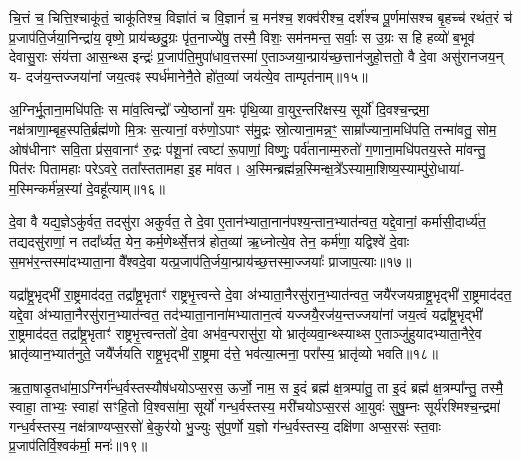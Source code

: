 चि॒त्तं च॒ चित्ति॒श्चाकू॑तं॒ चाकू॑तिश्च॒ विज्ञा॑तं च वि॒ज्ञानं॑ च॒ मन॑श्च॒ शक्व॑रीश्च॒ दर्\mbox{}श॑श्च पू॒र्णमा॑सश्च बृ॒हच्च॑ रथंत॒रं च॑ प्र॒जाप॑ति॒र्जया॒निन्द्रा॑य॒ वृष्णे॒ प्राय॑च्छदु॒ग्रः पृ॑त॒नाज्ये॑षु॒ तस्मै॒ विशः॒ सम॑नमन्त॒ सर्वाः॒ स उ॒ग्रः स हि हव्यो॑ ब॒भूव॑ देवासु॒राः संय॑त्ता आस॒न्थ्स इन्द्रः॑ प्र॒जाप॑ति॒मुपा॑धाव॒त्तस्मा॑ ए॒ताञ्जया॒न्प्राय॑च्छ॒त्तान॑जुहो॒त्ततो॒ वै दे॒वा असु॑रानजय॒न् य- दज॑य॒न्तज्जया॑नां जय॒त्वꣴ स्पर्ध॑मानेनै॒ते हो॑त॒व्या॑ जय॑त्ये॒व ताम्पृत॑नाम्॥१५॥

{\anuvakamend[{उप॒ पञ्च॑विꣳशतिश्च॥४॥}]}

अ॒ग्निर्भू॒ताना॒मधि॑पतिः॒ स मा॑व॒त्विन्द्रो᳚ ज्ये॒ष्ठानां᳚ य॒मः पृ॑थि॒व्या वा॒युर॒न्तरि॑क्षस्य॒ सूर्यो॑ दि॒वश्च॒न्द्रमा॒ नक्ष॑त्राणा॒म्बृह॒स्पति॒र्ब्रह्म॑णो मि॒त्रः स॒त्यानां॒ वरु॑णो॒\-ऽपाꣳ स॑मु॒द्रः स्रो॒त्याना॒मन्न॒ꣳ॒ साम्रा᳚ज्याना॒मधि॑पति॒ तन्मा॑वतु॒ सोम॒ ओष॑धीनाꣳ सवि॒ता प्र॑स॒वानाꣳ॑ रु॒द्रः प॑शू॒नां त्वष्टा॑ रू॒पाणां॒ विष्णुः॒ पर्व॑तानाम्म॒रुतो॑ ग॒णाना॒मधि॑पतय॒स्ते मा॑वन्तु॒ पित॑रः पितामहाः परे\-ऽवरे॒ तता᳚स्ततामहा इ॒ह मा॑वत। अ॒स्मिन्ब्रह्म॑न्न॒स्मिन्क्ष॒त्रे᳚\-ऽस्यामा॒शिष्य॒स्याम्पु॑रो॒धाया॑- म॒स्मिन्कर्म॑न्न॒स्यां दे॒वहू᳚त्याम्॥१६॥

{\anuvakamend[{अ॒व॒रे॒ स॒प्तद॑श च॥५॥}]}

दे॒वा वै यद्य॒ज्ञे\-ऽकु॑र्वत॒ तदसु॑रा अकुर्वत॒ ते दे॒वा ए॒तान॑भ्याता॒नान॑पश्य॒न्तान॒भ्यात॑न्वत॒ यद्दे॒वानां॒ कर्मासी॒दार्ध्य॑त॒ तद्यदसु॑राणां॒ न तदा᳚र्ध्यत॒ येन॒ कर्म॒णेर्थ्से॒त्तत्र॑ होत॒व्या॑ ऋ॒ध्नोत्ये॒व तेन॒ कर्म॑णा॒ यद्विश्वे॑ दे॒वाः स॒मभ॑र॒न्तस्मा॑दभ्याता॒ना वै᳚श्वदे॒वा यत्प्र॒जाप॑ति॒र्जया॒न्प्राय॑च्छ॒त्तस्मा॒ज्जयाः᳚ प्राजाप॒त्याः॥१७॥

यद्रा᳚ष्ट्र॒भृद्भी॑ रा॒ष्ट्रमाद॑दत॒ तद्रा᳚ष्ट्र॒भृताꣳ॑ राष्ट्रभृ॒त्त्वन्ते दे॒वा अ॑भ्याता॒नैरसु॑रान॒भ्यात॑न्वत॒ जयै॑रजयन्राष्ट्र॒भृद्भी॑ रा॒ष्ट्रमाद॑दत॒ यद्दे॒वा अ॑भ्याता॒नैरसु॑रान॒भ्यात॑न्वत॒ तद॑भ्याता॒नाना॑मभ्यातान॒त्वं यज्जयै॒रज॑य॒न्तज्जया॑नां जय॒त्वं यद्रा᳚ष्ट्र॒भृद्भी॑ रा॒ष्ट्रमाद॑दत॒ तद्रा᳚ष्ट्र॒भृताꣳ॑ राष्ट्रभृ॒त्त्वन्ततो॑ दे॒वा अभ॑व॒न्परासु॑रा॒ यो भ्रातृ॑व्यवा॒न्थ्स्याथ्स ए॒ताञ्जु॑हुयादभ्याता॒नैरे॒व भ्रातृ॑व्यान॒भ्यात॑नुते॒ जयै᳚र्जयति राष्ट्र॒भृद्भी॑ रा॒ष्ट्रमा द॑त्ते॒ भव॑त्या॒त्मना॒ परा᳚स्य॒ भ्रातृ॑व्यो भवति॥१८॥

{\anuvakamend[{प्रा॒जा॒प॒त्याः सो᳚\-ऽष्टाद॑श च॥६॥}]}

ऋ॒ता॒षाडृ॒तधा॑मा॒\-ऽग्निर्ग॑न्ध॒र्वस्तस्यौष॑धयो\-ऽप्स॒रस॒ ऊर्जो॒ नाम॒ स इ॒दं ब्रह्म॑ क्ष॒त्रम्पा॑तु॒ ता इ॒दं ब्रह्म॑ क्ष॒त्रम्पा᳚न्तु॒ तस्मै॒ स्वाहा॒ ताभ्यः॒ स्वाहा॑ सꣳहि॒तो वि॒श्वसा॑मा॒ सूर्यो॑ गन्ध॒र्वस्तस्य॒ मरी॑चयो\-ऽप्स॒रस॑ आ॒युवः॑ सुषु॒म्नः सूर्य॑रश्मिश्च॒न्द्रमा॑ गन्ध॒र्वस्तस्य॒ नक्ष॑त्राण्यप्स॒रसो॑ बे॒कुर॑यो भु॒ज्युः सु॑प॒र्णो य॒ज्ञो ग॑न्ध॒र्वस्तस्य॒ दक्षि॑णा अप्स॒रसः॑ स्त॒वाः प्र॒जाप॑तिर्वि॒श्वक॑र्मा॒ मनः॑॥१९॥

